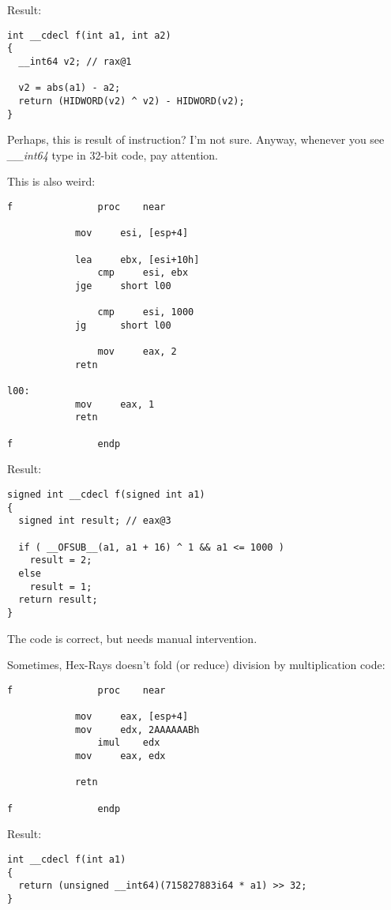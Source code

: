 Result:

\begin{lstlisting}[style=customc]
int __cdecl f(int a1, int a2)
{
  __int64 v2; // rax@1

  v2 = abs(a1) - a2;
  return (HIDWORD(v2) ^ v2) - HIDWORD(v2);
}
\end{lstlisting}

Perhaps, this is result of  instruction? I'm not sure.
Anyway, whenever you see \emph{\_\_int64} type in 32-bit code, pay attention.

This is also weird:

\begin{lstlisting}[style=customasmx86]
f               proc    near

	        mov     esi, [esp+4]

        	lea     ebx, [esi+10h]
                cmp     esi, ebx
	        jge     short l00

                cmp     esi, 1000
	        jg      short l00

                mov     eax, 2
	        retn

l00:
	        mov     eax, 1
        	retn

f               endp
\end{lstlisting}

Result:

\begin{lstlisting}[style=customc]
signed int __cdecl f(signed int a1)
{
  signed int result; // eax@3

  if ( __OFSUB__(a1, a1 + 16) ^ 1 && a1 <= 1000 )
    result = 2;
  else
    result = 1;
  return result;
}
\end{lstlisting}

The code is correct, but needs manual intervention.

Sometimes, Hex-Rays doesn't fold (or reduce) division by multiplication code:

\begin{lstlisting}[style=customasmx86]
f               proc    near

        	mov     eax, [esp+4]
	        mov     edx, 2AAAAAABh
                imul    edx
        	mov     eax, edx

	        retn

f               endp
\end{lstlisting}

Result:

\begin{lstlisting}[style=customc]
int __cdecl f(int a1)
{
  return (unsigned __int64)(715827883i64 * a1) >> 32;
}
\end{lstlisting}

